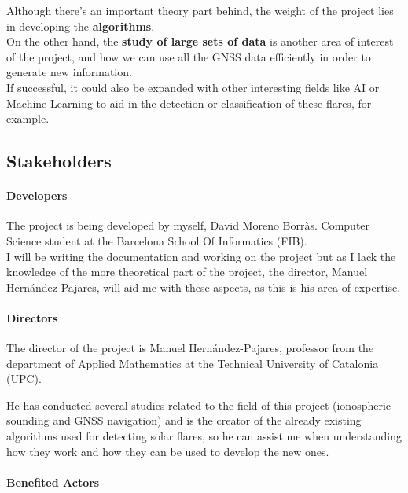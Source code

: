 Although there’s an important theory part behind, the weight of the project lies in developing the \textbf{algorithms}.\\

On the other hand, the \textbf{study of large sets of data} is another area of interest of the project, and how we can use all the GNSS data efficiently in order to generate new information.\\

If successful, it could also be expanded with other interesting fields like AI or Machine Learning to aid in the detection or classification of these flares, for example.

\subsection{Stakeholders}

\paragraph{Developers}

The project is being developed by myself, David Moreno Borràs. Computer Science student at the Barcelona School Of Informatics (FIB).\\

I will be writing the documentation and working on the project but as I lack the knowledge of the more theoretical part of the project, the director, Manuel Hernández-Pajares, will aid me with these aspects, as this is his area of expertise.

\paragraph{Directors}

The director of the project is Manuel Hernández-Pajares, professor from the department of Applied Mathematics at the Technical University of Catalonia (UPC). 

He has conducted several studies related to the field of this project (ionospheric sounding and GNSS navigation) and is the creator of the already existing algorithms used for detecting solar flares, so he can assist me when understanding how they work and how they can be used to develop the new ones.

\paragraph{Benefited Actors}

